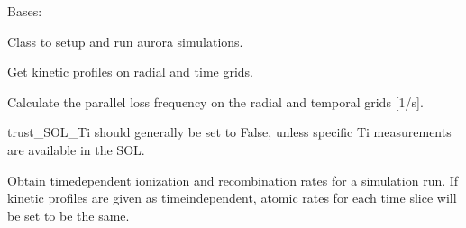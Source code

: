\documentclass[letterpaper,10pt,english]{sphinxmanual}
\begin{document}
\begin{fulllineitems}
\label{\detokenize{aurora:aurora.core.aurora_sim}}
Bases: 

Class to setup and run aurora simulations.

\begin{fulllineitems}
\label{\detokenize{aurora:aurora.core.aurora_sim.get_aurora_kin_profs}}
Get kinetic profiles on radial and time grids.

\end{fulllineitems}


\begin{fulllineitems}
\label{\detokenize{aurora:aurora.core.aurora_sim.get_par_loss_rate}}
Calculate the parallel loss frequency on the radial and temporal grids {[}1/s{]}.

trust\_SOL\_Ti should generally be set to False, unless specific Ti measurements are available
in the SOL.

\end{fulllineitems}


\begin{fulllineitems}
\label{\detokenize{aurora:aurora.core.aurora_sim.get_time_dept_atomic_rates}}
Obtain time\sphinxhyphen{}dependent ionization and recombination rates for a simulation run.
If kinetic profiles are given as time\sphinxhyphen{}independent, atomic rates for each time slice
will be set to be the same.


\end{fulllineitems}
\end{fulllineitems}
\end{document}
